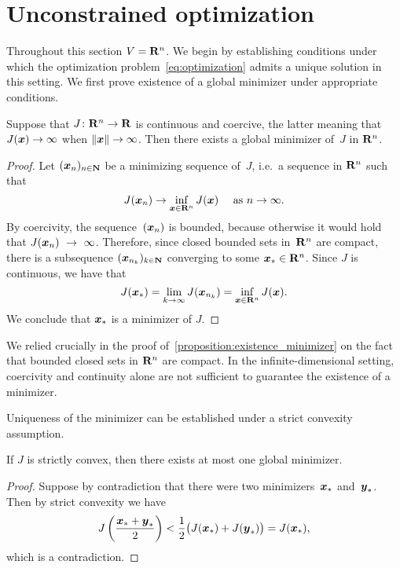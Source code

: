 \section{Unconstrained optimization}
\label{sec:unconstrained_optimization}
Throughout this section $V = \mathbf R^n$.
We begin by establishing conditions under which the optimization problem~\eqref{eq:optimization} admits a unique solution in this setting.
We first prove existence of a global minimizer under appropriate conditions.
\begin{proposition}
    \label{proposition:existence_minimizer}
    Suppose that $J \colon \mathbf R^n \to \mathbf R$ is continuous and coercive,
    the latter meaning that $J(\mathbf{\boldsymbol{x}}) \to \infty$ when $\lVert\mathbf{\boldsymbol{x}}\rVert \to \infty$.
    Then there exists a global minimizer of~$J$ in $\mathbf R^n$.
\end{proposition}
\begin{proof}
    Let $(\mathbf{\boldsymbol{x}}_n)_{n \in \mathbf N}$ be a minimizing sequence of~$J$,
    i.e.\ a sequence in $\mathbf R^n$ such that
    \[
        J(\mathbf{\boldsymbol{x}}_n) \to \inf_{\mathbf{\boldsymbol{x}} \in \mathbf R^n} J(\mathbf{\boldsymbol{x}}) \quad \text{ as $n \to \infty$}.
    \]
    By coercivity, the sequence~$(\mathbf{\boldsymbol{x}}_n)$ is bounded,
    because otherwise it would hold that $J(\mathbf{\boldsymbol{x}}_n)~\to~\infty$.
    Therefore, since closed bounded sets in~$\mathbf R^n$ are compact,
    there is a subsequence $(\mathbf{\boldsymbol{x}}_{n_k})_{k \in \mathbf N}$ converging to some $\mathbf{\boldsymbol{x}}_* \in \mathbf R^n$.
    Since $J$ is continuous, we have that
    \[
        J(\mathbf{\boldsymbol{x}}_*) = \lim_{k \to \infty} J(\mathbf{\boldsymbol{x}}_{n_k}) = \inf_{\mathbf{\boldsymbol{x}} \in \mathbf R^n} J(\mathbf{\boldsymbol{x}}).
    \]
    We conclude that $\mathbf{\boldsymbol{x}}_*$ is a minimizer of $J$.
\end{proof}
\begin{remark}
    We relied crucially in the proof of~\cref{proposition:existence_minimizer} on the fact that bounded closed sets in $\mathbf R^n$ are compact.
    In the infinite-dimensional setting,
    coercivity and continuity alone are not sufficient to guarantee the existence of a minimizer.
\end{remark}
Uniqueness of the minimizer can be established under a strict convexity assumption.

\begin{proposition}
    \label{proposition:uniqueness_minimizer}
    If $J$ is strictly convex,
    then there exists at most one global minimizer.
\end{proposition}
\begin{proof}
    Suppose by contradiction that there were two minimizers~$\mathbf{\boldsymbol{x}}_*$ and~$\mathbf{\boldsymbol{y}}_*$.
    Then by strict convexity we have
    \[
        J \left( \frac{\mathbf{\boldsymbol{x}}_* + \mathbf{\boldsymbol{y}}_*}{2} \right)
        < \frac{1}{2} \bigl( J(\mathbf{\boldsymbol{x}}_*) + J(\mathbf{\boldsymbol{y}}_*) \bigr) = J(\mathbf{\boldsymbol{x}}_*),
    \]
    which is a contradiction.
\end{proof}


